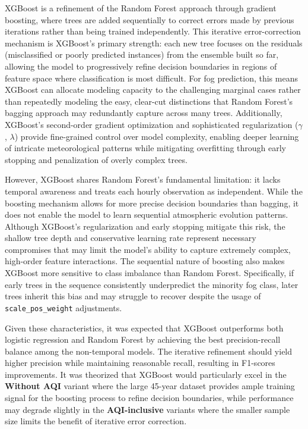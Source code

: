 \documentclass[
  letterpaper,
  DIV=11,
  numbers=noendperiod]{scrartcl}
\begin{document}
XGBoost is a refinement of the Random Forest approach through gradient
boosting, where trees are added sequentially to correct errors made by
previous iterations rather than being trained independently. This
iterative error-correction mechanism is XGBoost's primary strength: each
new tree focuses on the residuals (misclassified or poorly predicted
instances) from the ensemble built so far, allowing the model to
progressively refine decision boundaries in regions of feature space
where classification is most difficult. For fog prediction, this means
XGBoost can allocate modeling capacity to the challenging marginal cases
rather than repeatedly modeling the easy, clear-cut distinctions that
Random Forest's bagging approach may redundantly capture across many
trees. Additionally, XGBoost's second-order gradient optimization and
sophisticated regularization (\(\gamma\), \(\lambda\)) provide
fine-grained control over model complexity, enabling deeper learning of
intricate meteorological patterns while mitigating overfitting through
early stopping and penalization of overly complex trees.

However, XGBoost shares Random Forest's fundamental limitation: it lacks
temporal awareness and treats each hourly observation as independent.
While the boosting mechanism allows for more precise decision boundaries
than bagging, it does not enable the model to learn sequential
atmospheric evolution patterns. Although XGBoost's regularization and
early stopping mitigate this risk, the shallow tree depth and
conservative learning rate represent necessary compromises that may
limit the model's ability to capture extremely complex, high-order
feature interactions. The sequential nature of boosting also makes
XGBoost more sensitive to class imbalance than Random Forest.
Specifically, if early trees in the sequence consistently underpredict
the minority fog class, later trees inherit this bias and may struggle
to recover despite the usage of \texttt{scale\_pos\_weight} adjustments.

Given these characteristics, it was expected that XGBoost outperforms
both logistic regression and Random Forest by achieving the best
precision-recall balance among the non-temporal models. The iterative
refinement should yield higher precision while maintaining reasonable
recall, resulting in F1-scores improvements. It was theorized that
XGBoost would particularly excel in the \textbf{Without AQI} variant
where the large 45-year dataset provides ample training signal for the
boosting process to refine decision boundaries, while performance may
degrade slightly in the \textbf{AQI-inclusive} variants where the
smaller sample size limits the benefit of iterative error correction.
\end{document}
